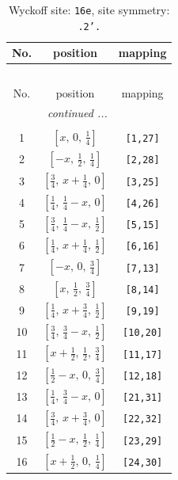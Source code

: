 \documentclass[fleqn,8pt]{jsarticle}
\begin{document}
\renewcommand{\arraystretch}{1.2}
\begin{longtable}{ccc}
\caption{Wyckoff site: {\tt 16e}, site symmetry: {\tt .2'.}}
 \\
 \hline \hline
No. & position & mapping \\ \hline \endfirsthead

\multicolumn{2}{l}{\tablename\ \thetable{}} \\
 \hline \hline
No. & position & mapping \\ \hline \endhead

 \hline \hline
\multicolumn{2}{r}{\footnotesize\it continued ...} \\ \endfoot

 \hline \hline
\multicolumn{2}{r}{} \\ \endlastfoot

1 & $\left[ x,\, 0,\, \frac{1}{4} \right]$ & {\tt [1,27]} \\ \hline
2 & $\left[ - x,\, \frac{1}{2},\, \frac{1}{4} \right]$ & {\tt [2,28]} \\ \hline
3 & $\left[ \frac{3}{4},\, x + \frac{1}{4},\, 0 \right]$ & {\tt [3,25]} \\ \hline
4 & $\left[ \frac{1}{4},\, \frac{1}{4} - x,\, 0 \right]$ & {\tt [4,26]} \\ \hline
5 & $\left[ \frac{3}{4},\, \frac{1}{4} - x,\, \frac{1}{2} \right]$ & {\tt [5,15]} \\ \hline
6 & $\left[ \frac{1}{4},\, x + \frac{1}{4},\, \frac{1}{2} \right]$ & {\tt [6,16]} \\ \hline
7 & $\left[ - x,\, 0,\, \frac{3}{4} \right]$ & {\tt [7,13]} \\ \hline
8 & $\left[ x,\, \frac{1}{2},\, \frac{3}{4} \right]$ & {\tt [8,14]} \\ \hline
9 & $\left[ \frac{1}{4},\, x + \frac{3}{4},\, \frac{1}{2} \right]$ & {\tt [9,19]} \\ \hline
10 & $\left[ \frac{3}{4},\, \frac{3}{4} - x,\, \frac{1}{2} \right]$ & {\tt [10,20]} \\ \hline
11 & $\left[ x + \frac{1}{2},\, \frac{1}{2},\, \frac{3}{4} \right]$ & {\tt [11,17]} \\ \hline
12 & $\left[ \frac{1}{2} - x,\, 0,\, \frac{3}{4} \right]$ & {\tt [12,18]} \\ \hline
13 & $\left[ \frac{1}{4},\, \frac{3}{4} - x,\, 0 \right]$ & {\tt [21,31]} \\ \hline
14 & $\left[ \frac{3}{4},\, x + \frac{3}{4},\, 0 \right]$ & {\tt [22,32]} \\ \hline
15 & $\left[ \frac{1}{2} - x,\, \frac{1}{2},\, \frac{1}{4} \right]$ & {\tt [23,29]} \\ \hline
16 & $\left[ x + \frac{1}{2},\, 0,\, \frac{1}{4} \right]$ & {\tt [24,30]} \\
\end{longtable}
\end{document}
